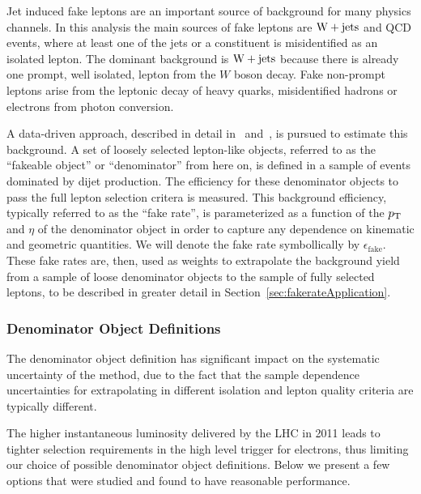 
Jet induced fake leptons are an important source of background for many 
physics channels. 
In this analysis the main sources of fake leptons are
$\mathrm{W+jets}$ and QCD events, where at least one of the jets or a
constituent is misidentified as an isolated lepton. 
The dominant background is $\mathrm{W+jets}$ because there is already one prompt, 
well isolated, lepton from the $W$ boson decay.
Fake non-prompt leptons arise from the leptonic decay
of heavy quarks, misidentified hadrons or electrons from 
photon conversion.

A data-driven approach, described in detail in~\cite{fakeLeptonNote1} 
and~\cite{fakeLeptonNote2}, is pursued to estimate this background. 
A set of loosely selected lepton-like objects, referred to as the 
``fakeable object'' or ``denominator'' from here on, is defined in a 
sample of events dominated by dijet production. 
The efficiency for these denominator objects to pass 
the full lepton selection critera is measured. 
This background efficiency, typically referred to as the ``fake rate'', 
is parameterized as a function of the $p_\mathrm{T}$ and $\eta$ of the denominator 
object in order to capture any dependence on kinematic and geometric quantities. 
We will denote the fake rate symbollically by $\epsilon_{\mathrm{fake}}$.
These fake rates are, then, used as weights to extrapolate
the background yield from a sample of loose denominator objects to the sample
of fully selected leptons, to be described in greater detail
in Section~\ref{sec:fakerateApplication}.

\subsubsection{Denominator Object Definitions}
\label{sec:fakerateDenominatorObjectDef}
The denominator object definition has significant impact on the
systematic uncertainty of the method, due to the fact that 
the sample dependence uncertainties for extrapolating in different 
isolation and lepton quality criteria are typically different.

The higher instantaneous luminosity delivered by the LHC in 2011 leads to
tighter selection requirements in the high level trigger for electrons, 
thus limiting our choice of possible denominator object definitions. 
Below we present a few options that were studied 
and found to have reasonable performance.

